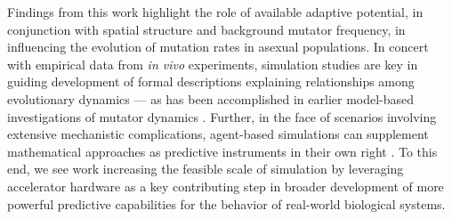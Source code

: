 Findings from this work highlight the role of available adaptive potential, in conjunction with spatial structure and background mutator frequency, in influencing the evolution of mutation rates in asexual populations.
In concert with empirical data from \textit{in vivo} experiments, simulation studies are key in guiding development of formal descriptions explaining relationships among evolutionary dynamics --- as has been accomplished in earlier model-based investigations of mutator dynamics \citep{wylie2009fixation,raynes2018sign}.
Further, in the face of scenarios involving extensive mechanistic complications, agent-based simulations can supplement mathematical approaches as predictive instruments in their own right \citep{an2009agent}.
To this end, we see work increasing the feasible scale of simulation by leveraging accelerator hardware as a key contributing step in broader development of more powerful predictive capabilities for the behavior of real-world biological systems.
